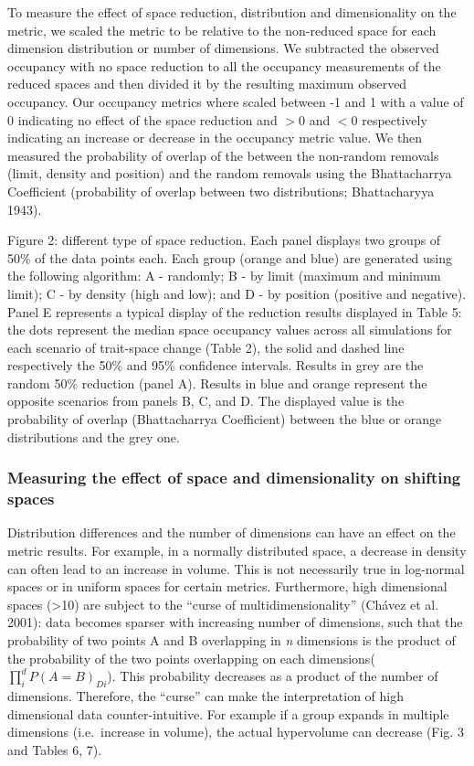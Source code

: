 \documentclass[]{article}
\begin{document}
To measure the effect of space reduction, distribution and
dimensionality on the metric, we scaled the metric to be relative to the
non-reduced space for each dimension distribution or number of
dimensions. We subtracted the observed occupancy with no space reduction
to all the occupancy measurements of the reduced spaces and then divided
it by the resulting maximum observed occupancy. Our occupancy metrics
where scaled between -1 and 1 with a value of 0 indicating no effect of
the space reduction and \(>0\) and \(<0\) respectively indicating an
increase or decrease in the occupancy metric value. We then measured the
probability of overlap of the between the non-random removals (limit,
density and position) and the random removals using the Bhattacharrya
Coefficient (probability of overlap between two distributions;
Bhattacharyya 1943).

\newpage
\renewcommand\baselinestretch{1}\selectfont

Figure 2: different type of space reduction. Each panel
displays two groups of 50\% of the data points each. Each group (orange
and blue) are generated using the following algorithm: A - randomly; B -
by limit (maximum and minimum limit); C - by density (high and low); and
D - by position (positive and negative). Panel E represents a typical
display of the reduction results displayed in Table 5: the dots
represent the median space occupancy values across all simulations for
each scenario of trait-space change (Table 2), the solid and dashed line
respectively the 50\% and 95\% confidence intervals. Results in grey are
the random 50\% reduction (panel A). Results in blue and orange
represent the opposite scenarios from panels B, C, and D. The displayed
value is the probability of overlap (Bhattacharrya Coefficient) between
the blue or orange distributions and the grey one.

\renewcommand\baselinestretch{2}\selectfont

\subsubsection{Measuring the effect of space and dimensionality on
shifting
spaces}\label{measuring-the-effect-of-space-and-dimensionality-on-shifting-spaces}

Distribution differences and the number of dimensions can have an effect
on the metric results. For example, in a normally distributed space, a
decrease in density can often lead to an increase in volume. This is not
necessarily true in log-normal spaces or in uniform spaces for certain
metrics. Furthermore, high dimensional spaces (\textgreater{}10) are
subject to the ``curse of multidimensionality'' (Chávez et al. 2001):
data becomes sparser with increasing number of dimensions, such that the
probability of two points A and B overlapping in \emph{n} dimensions is
the product of the probability of the two points overlapping on each
dimensions(\(\prod_{i}^{d} P(A = B)_{Di}\)). This probability decreases
as a product of the number of dimensions. Therefore, the ``curse'' can
make the interpretation of high dimensional data counter-intuitive. For
example if a group expands in multiple dimensions (i.e.~increase in
volume), the actual hypervolume can decrease (Fig. 3 and Tables 6, 7).
\end{document}
